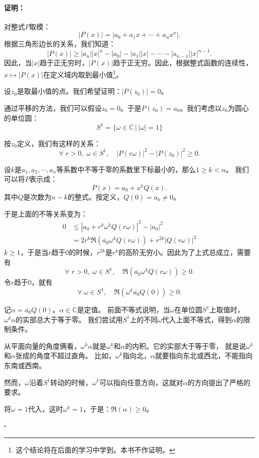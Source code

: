 \documentclass[12pt,UTF8]{ctexbook}
\theoremstyle{definition}
\theoremstyle{plain}
\renewenvironment{proof}{\paragraph{\textbf{证明：}}}{\hfill$\square$}
\begin{document}
\begin{appendix}
\begin{proof}
    对整式$P$取模：
    $$ |P(x)| = |a_0 + a_1 x + \cdots + a_n x^n|. $$
    根据三角形边长的关系，我们知道：
    $$ |P(x)| \geqslant |a_n| |x|^n - |a_0| - |a_1||x| - \cdots - |a_{n-1}| |x|^{n-1}. $$
    因此，当$|x|$趋于正无穷时，$|P(x)|$趋于正无穷。因此，根据整式函数的连续性，$x\mapsto |P(x)|$在定义域内取到最小值\footnote{这个结论将在后面的学习中学到。本书不作证明。}。

    设$z_0$是取最小值的点。我们希望证明：$|P(z_0)| = 0$。
    
    通过平移的方法，我们可以假设$z_0 = 0$。于是$P(z_0) = a_0$。我们考虑以$z_0$为圆心的单位圆：
    $$ S^1 = \{\omega\in\mathbb{C} \, | \, |\omega| = 1\}$$

    按$z_0$定义，我们有这样的关系：
    $$ \forall \; r > 0, \; \omega \in S^1,\quad  |P(r\omega)|^2 - |P(z_0)|^2 \geqslant 0. $$ 

    设$k$是$a_1, a_2, \cdots, a_n$等系数中不等于零的系数里下标最小的，那么$1\geqslant k < n$。
    我们可以将$P$表示成：
    $$ P(x) = a_0 + x^k Q(x). $$
    其中$Q$是次数为$n - k$的整式。按定义，$Q(0) = a_k \neq 0$。

    于是上面的不等关系变为：
    \begin{align*}
        0 &\leqslant |a_0 + r^k \omega^k Q(r\omega)|^2 - |a_0|^2 \\
          &= 2r^k \Re(\overline{a_0} \omega^k Q(r\omega)) + r^{2k}|Q(r\omega)|^2 
    \end{align*}
    $k\geqslant 1$，于是当$r$趋于$0$的时候，$r^{2k}$是$r^k$的高阶无穷小。因此为了上式总成立，需要有
    $$ \forall \; r > 0,\; \omega \in S^1,\quad \Re(\overline{a_0} \omega^k Q(r\omega)) \geqslant 0. $$
    令$r$趋于$0$，就有
    $$ \forall \; \omega \in S^1,\quad \Re(\omega^k\overline{a_0} Q(0)) \geqslant 0. $$

    记$\alpha = \overline{a_0} Q(0)$。$\alpha \in\mathbb{C}$是定值。
    前面不等式说明，当$\omega$在单位圆$S^1$上取值时，$\omega^k \alpha$的实部总大于等于零。
    我们尝试用$S^1$上的不同$\omega$代入上面不等式，得到$\alpha$的限制条件。

    从平面向量的角度俩看，$\omega^k \alpha$就是$\omega^k$和$\alpha$的内积。它的实部大于等于零，
    就是说$\omega^k$和$\alpha$张成的角度不超过直角。
    比如，$\omega^k$指向北，$\alpha$就要指向东北或西北，不能指向东南或西南。

    然而，$\omega$沿着$S^1$转动的时候，$\omega^k$可以指向任意方向，这就对$\alpha$的方向提出了严格的要求。

    将$\omega = 1$代入，这时$\omega^k = 1$，于是：$\Re(\alpha) \geqslant 0$。


\end{proof}
\end{appendix}
\end{document}
